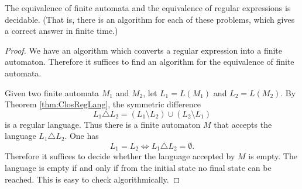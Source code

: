 \begin{page}

\begin{thm}
The equivalence of finite automata and the equivalence of regular expressions is decidable.
(That is, there is an algorithm for each of these problems, which gives a correct answer in finite time.)
\end{thm}

\end{page}

\begin{page}

\begin{proof}
We have an algorithm which converts a regular expression into a finite automaton.
Therefore it suffices to find an algorithm for the equivalence of finite automata.

Given two finite automata $M_1$ and $M_2$, let $L_1 = L(M_1)$ and $L_2 = L(M_2)$.
By Theorem \ref{thm:ClosRegLang}, the symmetric difference
\[
L_1 \triangle L_2 = (L_1 \setminus L_2) \cup (L_2 \setminus L_1)
\]
is a regular language.
Thus there is a finite automaton $M$ that accepts the language $L_1 \triangle L_2$.
One has
\[
L_1 = L_2 \Leftrightarrow L_1 \triangle L_2 = \emptyset.
\]
Therefore it suffices to decide whether the language accepted by $M$ is empty.
The language is empty if and only if from the initial state no final state can be reached.
This is easy to check algorithmically.
\end{proof}





\end{page}

